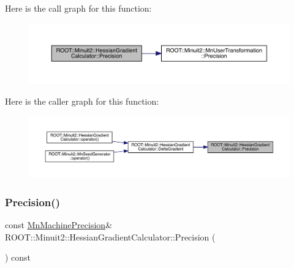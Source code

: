 Here is the call graph for this function\+:
\nopagebreak
\begin{figure}[H]
\begin{center}
\leavevmode
\includegraphics[width=350pt]{dc/d17/classROOT_1_1Minuit2_1_1HessianGradientCalculator_afeacc0589b4f4d6a1e6e6b985f24cc3b_cgraph}
\end{center}
\end{figure}
Here is the caller graph for this function\+:
\nopagebreak
\begin{figure}[H]
\begin{center}
\leavevmode
\includegraphics[width=350pt]{dc/d17/classROOT_1_1Minuit2_1_1HessianGradientCalculator_afeacc0589b4f4d6a1e6e6b985f24cc3b_icgraph}
\end{center}
\end{figure}
\mbox{\label{classROOT_1_1Minuit2_1_1HessianGradientCalculator_a256d75d036a5c53b0b679830ca4ac714}} 
\subsubsection{\texorpdfstring{Precision()}{Precision()}\hspace{0.1cm}{\footnotesize\ttfamily [3/3]}}
{\footnotesize\ttfamily const \mbox{\hyperlink{classROOT_1_1Minuit2_1_1MnMachinePrecision}{Mn\+Machine\+Precision}}\& R\+O\+O\+T\+::\+Minuit2\+::\+Hessian\+Gradient\+Calculator\+::\+Precision (\begin{DoxyParamCaption}{ }\end{DoxyParamCaption}) const}

\mbox{\label{classROOT_1_1Minuit2_1_1HessianGradientCalculator_ac66592218817d4cbc8a3be76938b435d}} 
